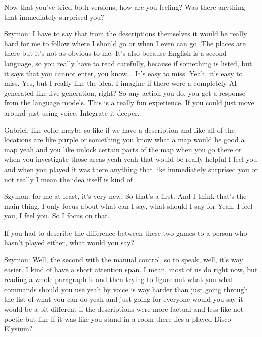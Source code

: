 \begin{QandA}
   \item Now that you’ve tried both versions, how are you feeling? Was there anything that immediately surprised you?
         \begin{answered}
            Szymon: I have to say that from the descriptions themselves it would be really hard for me to follow where I should go or when I even can go.
            The places are there but it's not as obvious to me.
            It's also because English is a second language, so you really have to read carefully, because if something is listed, but it says that you cannot enter, you know...
            It's easy to miss.
            Yeah, it's easy to miss.
            Yes, but I really like the idea.
            I imagine if there were a completely AI-generated
            like live generation, right?
            So any action you do, you get a response from the language models.
            This is a really fun experience.
            If you could just move around just using voice.
            Integrate it deeper.


            Gabriel: like color maybe so like if we have a description and like all of the locations are like purple or something you know what a map would be good a map yeah and you like unlock certain parts of the map when you go there or when you investigate those areas yeah yeah that would be really helpful I feel you and when you played it was there anything that like immediately surprised you or not really I mean the idea itself is kind of

            Szymon: for me at least, it's very new.
            So that's a first.
            And I think that's the main thing.
            I only focus about what can I say, what should I say for
            Yeah, I feel you, I feel you.
            So I focus on that.
            \end{answered}

   \item If you had to describe the difference between these two games to a person who hasn't played either, what would you say?
         \begin{answered}
               Szymon: Well, the second with the manual control, so to speak, well, it's way easier.
               I kind of have a short attention span.
               I mean, most of us do right now, but
               reading a whole paragraph is and then trying to figure out what you what commands should you use yeah by voice is way harder than just going through the list of what you can do yeah and just going for everyone would you say it would be a bit different if the descriptions were more factual and less like not poetic but like if it was like you stand in a room there lies a
               played Disco Elysium?


\end{answered}
\end{QandA}
